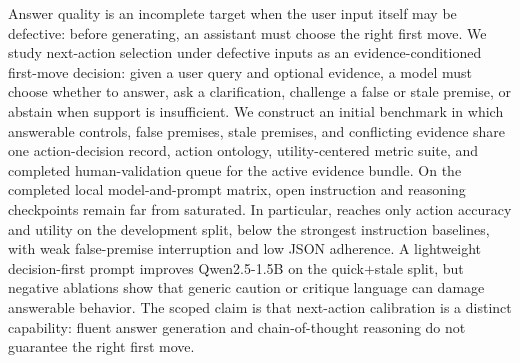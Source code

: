 Answer quality is an incomplete target when the user input itself may be defective: before generating, an assistant must choose the right first move. We study next-action selection under defective inputs as an evidence-conditioned first-move decision: given a user query and optional evidence, a model must choose whether to answer, ask a clarification, challenge a false or stale premise, or abstain when support is insufficient. We construct an initial benchmark in which answerable controls, false premises, stale premises, and conflicting evidence share one action-decision record, action ontology, utility-centered metric suite, and completed human-validation queue for the active evidence bundle. On the completed local model-and-prompt matrix, open instruction and reasoning checkpoints remain far from saturated. In particular, \DayOneScaleReasoningLargestMatchedReasoningModel{} reaches only \DayOneScaleReasoningLargestMatchedReasoningActionAcc{} action accuracy and \DayOneScaleReasoningLargestMatchedReasoningUtility{} utility on the development split, below the strongest instruction baselines, with weak false-premise interruption and low JSON adherence. A lightweight decision-first prompt improves Qwen2.5-1.5B on the quick+stale split, but negative ablations show that generic caution or critique language can damage answerable behavior. The scoped claim is that next-action calibration is a distinct capability: fluent answer generation and chain-of-thought reasoning do not guarantee the right first move.
